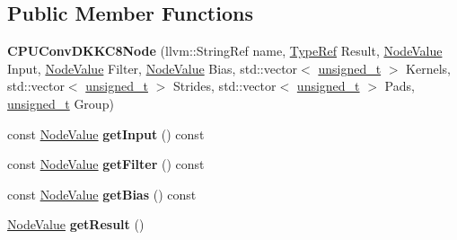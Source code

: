\subsection*{Public Member Functions}
\begin{DoxyCompactItemize}
\item 
\mbox{\label{classglow_1_1_c_p_u_conv_d_k_k_c8_node_a316a1637e9e1dd8d95cd3d62e49fecea}} 
{\bfseries C\+P\+U\+Conv\+D\+K\+K\+C8\+Node} (llvm\+::\+String\+Ref name, \hyperlink{structglow_1_1_type}{Type\+Ref} Result, \hyperlink{structglow_1_1_node_value}{Node\+Value} Input, \hyperlink{structglow_1_1_node_value}{Node\+Value} Filter, \hyperlink{structglow_1_1_node_value}{Node\+Value} Bias, std\+::vector$<$ \hyperlink{namespaceglow_a0ca574644e1e42ef193a9947fb4d8911}{unsigned\+\_\+t} $>$ Kernels, std\+::vector$<$ \hyperlink{namespaceglow_a0ca574644e1e42ef193a9947fb4d8911}{unsigned\+\_\+t} $>$ Strides, std\+::vector$<$ \hyperlink{namespaceglow_a0ca574644e1e42ef193a9947fb4d8911}{unsigned\+\_\+t} $>$ Pads, \hyperlink{namespaceglow_a0ca574644e1e42ef193a9947fb4d8911}{unsigned\+\_\+t} Group)
\item 
\mbox{\label{classglow_1_1_c_p_u_conv_d_k_k_c8_node_ac94ec5ddf53c498dcd81fdd292ed736d}} 
const \hyperlink{structglow_1_1_node_value}{Node\+Value} {\bfseries get\+Input} () const
\item 
\mbox{\label{classglow_1_1_c_p_u_conv_d_k_k_c8_node_aa622c982d328cd656eca2fe3d855b77d}} 
const \hyperlink{structglow_1_1_node_value}{Node\+Value} {\bfseries get\+Filter} () const
\item 
\mbox{\label{classglow_1_1_c_p_u_conv_d_k_k_c8_node_ab5ea51f4f7d6ef1365400532936edb6d}} 
const \hyperlink{structglow_1_1_node_value}{Node\+Value} {\bfseries get\+Bias} () const
\item 
\mbox{\label{classglow_1_1_c_p_u_conv_d_k_k_c8_node_a1ab0066dbf7520d7300e80d5a578174c}} 
\hyperlink{structglow_1_1_node_value}{Node\+Value} {\bfseries get\+Result} ()
\item 
\mbox{\label{classglow_1_1_c_p_u_conv_d_k_k_c8_node_acd95252666faf6c1cd6c8693721672d7}} 

\end{DoxyCompactItemize}
